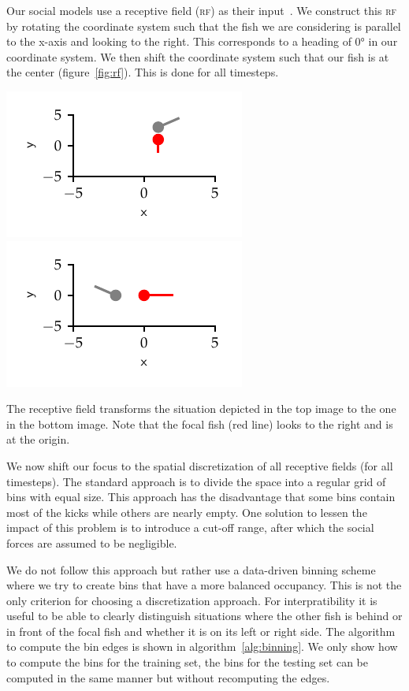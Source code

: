 \documentclass[nobib, a4paper]{tufte-handout}
\begin{document}
Our social models use a receptive field (\textsc{rf}) as their input~\autocite{discreteModes}.
We construct this \textsc{rf} by rotating the coordinate system such that the fish we are considering is parallel to the x-axis and looking to the right.
This corresponds to a heading of \ang{0} in our coordinate system.
We then shift the coordinate system such that our fish is at the center (figure~\ref{fig:rf}).
This is done for all timesteps.

\begin{marginfigure}
 \includegraphics{receptive_field_before_margin} 
 \includegraphics[scale=1]{receptive_field_after_margin} 
 \caption{The receptive field transforms the situation depicted in the top image to the one in the bottom image.
 Note that the focal fish (red line) looks to the right and is at the origin.}
\label{fig:rf}
\end{marginfigure}

We now shift our focus to the spatial discretization of all receptive fields (for all timesteps).
The standard approach is to divide the space into a regular grid of bins with equal size.
This approach has the disadvantage that some bins contain most of the kicks while others are nearly empty.
One solution to lessen the impact of this problem is to introduce a cut-off range, after which the social forces are assumed to be negligible.

We do not follow this approach but rather use a data-driven binning scheme where we try to create bins that have a more balanced occupancy.
This is not the only criterion for choosing a discretization approach.
For interpratibility it is useful to be able to clearly distinguish situations where the other fish is behind or in front of the focal fish and whether it is on its left or right side.
The algorithm to compute the bin edges is shown in algorithm~\ref{alg:binning}.
We only show how to compute the bins for the training set, the bins for the testing set can be computed in the same manner but without recomputing the edges.
\end{document}
